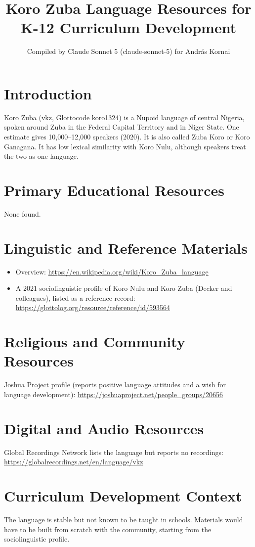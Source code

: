 \documentclass[12pt]{article}
\title{Koro Zuba Language Resources for K-12 Curriculum Development}
\author{Compiled by Claude Sonnet 5 (claude-sonnet-5) for Andr\'as Kornai}
\date{}
\begin{document}
\maketitle

\section{Introduction}
Koro Zuba (vkz, Glottocode koro1324) is a Nupoid language of central Nigeria, spoken around Zuba in the Federal Capital Territory and in Niger State. One estimate gives 10,000--12,000 speakers (2020). It is also called Zuba Koro or Koro Ganagana. It has low lexical similarity with Koro Nulu, although speakers treat the two as one language.

\section{Primary Educational Resources}
None found.

\section{Linguistic and Reference Materials}
\begin{itemize}
\item Overview: \url{https://en.wikipedia.org/wiki/Koro_Zuba_language}
\item A 2021 sociolinguistic profile of Koro Nulu and Koro Zuba (Decker and colleagues), listed as a reference record: \url{https://glottolog.org/resource/reference/id/593564}
\end{itemize}

\section{Religious and Community Resources}
Joshua Project profile (reports positive language attitudes and a wish for language development): \url{https://joshuaproject.net/people_groups/20656}

\section{Digital and Audio Resources}
Global Recordings Network lists the language but reports no recordings: \url{https://globalrecordings.net/en/language/vkz}

\section{Curriculum Development Context}
The language is stable but not known to be taught in schools. Materials would have to be built from scratch with the community, starting from the sociolinguistic profile.
\end{document}
